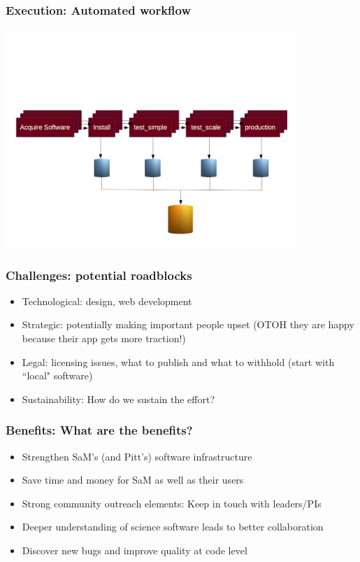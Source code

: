 \documentclass[hyperref={pdfpagelabels=false},12pt]{beamer}
\begin{document}
\begin{frame}
\frametitle{Execution: Automated workflow}
\begin{center}
\includegraphics[width=11cm]{workflow}
\end{center}
\end{frame}

\begin{frame}
\frametitle{Challenges: potential roadblocks}
\begin{itemize}
\itemsep1em
\item
Technological: design, web development
\item 
Strategic: potentially making important people upset (OTOH they are happy because their app gets more traction!)
\item
Legal: licensing issues, what to publish and what to withhold (start with ``local" software)
\item
 Sustainability: How do we sustain the effort?
\end{itemize}
\end{frame}

\begin{frame}
\frametitle{Benefits: What are the benefits?}
\begin{itemize}
\itemsep1em
\item Strengthen SaM's (and Pitt's) software infrastructure
\item
Save time and money for SaM as well as their users
\item
Strong community outreach elements: Keep in touch with leaders/PIs 
\item
Deeper understanding of science software leads to better collaboration
\item
Discover new bugs and improve quality at code level
\end{itemize}
\end{frame}
\end{document}

